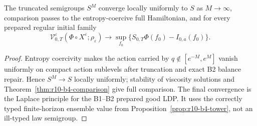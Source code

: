 \begin{theorem}
\label{thm:r10-b4-main}
The truncated semigroups $S^M$ converge locally uniformly to $S$ as
$M\to\infty$, comparison passes to the entropy-coercive full Hamiltonian, and
for every prepared regular initial family
\[
 \mathcal V_{0,T}^\varepsilon(\Phi\circ X^\varepsilon;\rho_\varepsilon)
 \longrightarrow
 \sup_{f_0}\{S_{0,T}\Phi(f_0)-I_{0,a}(f_0)\}.
\]
\end{theorem}

\begin{proof}
Entropy coercivity makes the action carried by
$q\notin[e^{-M},e^M]$ vanish uniformly on compact action sublevels after
truncation and exact B2 balance repair.  Hence $S^M\to S$ locally uniformly;
stability of viscosity solutions and Theorem~\ref{thm:r10-b4-comparison}
give full comparison.  The final convergence is the Laplace principle for
the B1--B2 prepared good LDP.  It uses the correctly typed finite-horizon
ensemble value from Proposition~\ref{prop:r10-b4-tower}, not an ill-typed law
semigroup.
\end{proof}
